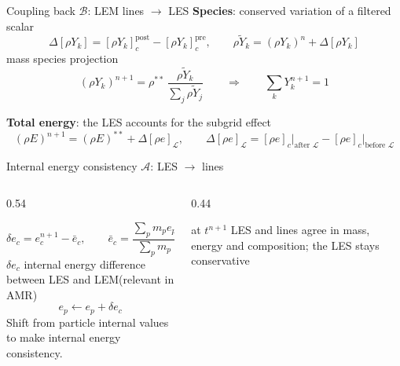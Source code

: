 \documentclass[aspectratio=169,10pt]{beamer}
\newcommand{\F}{\mathcal{F}}          %
\renewcommand{\L}{\mathcal{L}}        %
\newcommand{\B}{\mathcal{B}}          %
\newcommand{\A}{\mathcal{A}}          %
\newcommand{\filt}[1]{[#1]_c}
\begin{document}
\begin{frame}{Coupling back $\B$: LEM lines $\to$ LES}
\small
\textbf{Species}: conserved variation of a filtered scalar
\[
\Delta[\rho Y_k] = \filt{\rho Y_k}^{\mathrm{post}} - \filt{\rho Y_k}^{\mathrm{pre}},\qquad
\widetilde{\rho Y_k} = (\rho Y_k)^{n} + \Delta[\rho Y_k]
\]
mass species projection
\[
(\rho Y_k)^{n+1} = \rho^{**}\,\frac{\widetilde{\rho Y_k}}{\sum_j \widetilde{\rho Y_j}}
\qquad\Longrightarrow\qquad \sum_k Y_k^{n+1} = 1
\]

\vspace{2mm}
\textbf{Total energy}: the LES accounts for the subgrid effect
\[
(\rho E)^{n+1} = (\rho E)^{**} + \Delta[\rho e]_{\L},\qquad
\Delta[\rho e]_{\L} = \filt{\rho e}\big|_{\text{after }\L} - \filt{\rho e}\big|_{\text{before }\L}
\]

\end{frame}

\begin{frame}{Internal energy consistency $\A$: LES $\to$ lines}
\small
\begin{columns}[T]
\begin{column}{0.54\textwidth}

\[
\delta e_c = e^{n+1}_c - \bar e_c,\qquad \bar e_c = \frac{\sum_p m_p e_p}{\sum_p m_p}
\]
$\delta e_c$ internal energy difference between LES and LEM(relevant in AMR)
\[
e_p \leftarrow e_p + \delta e_c
\]
Shift from particle internal values to make internal energy consistency.

\end{column}
\begin{column}{0.44\textwidth}
\centering
{}

\vspace{3mm}
at $t^{n+1}$ LES and lines agree in mass, energy and composition; the LES stays conservative
\end{column}
\end{columns}
\end{frame}
\end{document}
